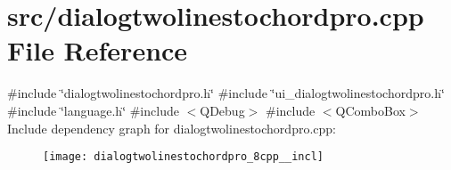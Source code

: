 \section{src/dialogtwolinestochordpro.cpp File Reference}
\label{dialogtwolinestochordpro_8cpp}
{\ttfamily \#include \char`\"{}dialogtwolinestochordpro.\+h\char`\"{}}\newline
{\ttfamily \#include \char`\"{}ui\+\_\+dialogtwolinestochordpro.\+h\char`\"{}}\newline
{\ttfamily \#include \char`\"{}language.\+h\char`\"{}}\newline
{\ttfamily \#include $<$Q\+Debug$>$}\newline
{\ttfamily \#include $<$Q\+Combo\+Box$>$}\newline
Include dependency graph for dialogtwolinestochordpro.\+cpp\+:\nopagebreak
\begin{figure}[H]
\begin{center}
\leavevmode
\texttt{[image: dialogtwolinestochordpro\_8cpp\_\_incl]}
\end{center}
\end{figure}
